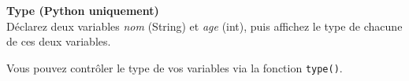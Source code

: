 \begin{Exercice}[3 minutes] \textbf{Type (Python uniquement)}\\
   Déclarez deux variables \textit{nom} (String) et \textit{age} (int), puis affichez le type de chacune de ces deux variables.
   
    \begin{conseil}
       Vous pouvez contrôler le type de vos variables via la fonction \lstinline{type()}.
        
    \end{conseil}
    \begin{solution}
     
    
           
    \end{solution}   
\end{Exercice}

